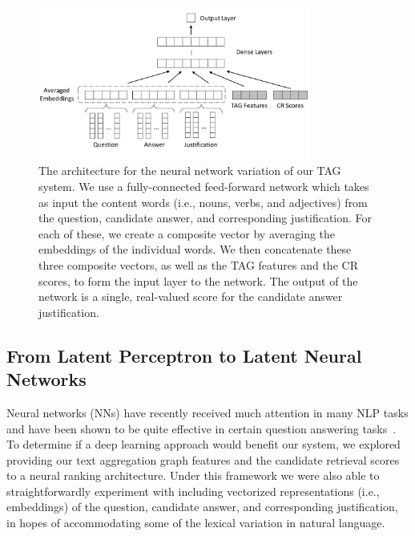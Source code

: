 {\begin{figure}
\centering
\includegraphics[width=0.8\textwidth]{mainmatter/tacl2015-tig/tagNNArch2scores.pdf}
\caption{The architecture for the neural network variation of our TAG system. We use a fully-connected feed-forward network which takes as input the content words (i.e., nouns, verbs, and adjectives) from the question, candidate answer, and corresponding justification.  For each of these, we create a composite vector by averaging the embeddings of the individual words.  We then concatenate these three composite vectors, as well as the TAG features and the CR scores, to form the input layer to the network. The output of the network is a single, real-valued score for the candidate answer justification.}
\label{fig:nn_arch}
\end{figure}

\subsection{From Latent Perceptron to Latent Neural Networks}
\label{sec-cl2017:nn}

Neural networks (NNs) have recently received much attention in many NLP tasks and have been shown to be quite effective in certain question answering tasks~\cite{Iyyer2014,bordes2014question,bordes2015large,Iyyer2015,wang2015long,dong2015question,yih2015semantic,he2016pairwise,suggu2016deep}.  To determine if a deep learning approach would benefit our system, we explored providing our text aggregation graph features and the candidate retrieval scores to a neural ranking architecture.  Under this framework we were also able to straightforwardly experiment with including vectorized representations (i.e., embeddings) of the question, candidate answer, and corresponding justification, in hopes of accommodating some of the lexical variation in natural language.

}
